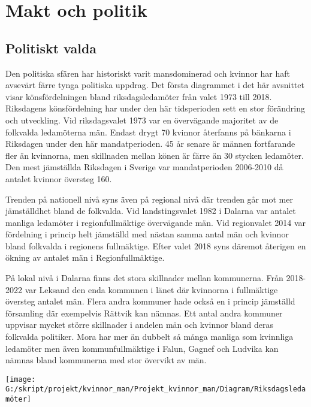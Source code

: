 \documentclass[
]{article}
\begin{document}
\hypertarget{makt-och-politik}{%
\section{Makt och politik}\label{makt-och-politik}}

\hypertarget{politiskt-valda}{%
\subsection{Politiskt valda}\label{politiskt-valda}}

Den politiska sfären har historiskt varit mansdominerad och kvinnor har
haft avsevärt färre tynga politiska uppdrag. Det första diagrammet i det
här avsnittet visar könsfördelningen bland riksdagsledamöter från valet
1973 till 2018. Riksdagens könsfördelning har under den här tidsperioden
sett en stor förändring och utveckling. Vid riksdagsvalet 1973 var en
övervägande majoritet av de folkvalda ledamöterna män. Endast drygt 70
kvinnor återfanns på bänkarna i Riksdagen under den här mandatperioden.
45 år senare är männen fortfarande fler än kvinnorna, men skillnaden
mellan könen är färre än 30 stycken ledamöter. Den mest jämställda
Riksdagen i Sverige var mandatperioden 2006-2010 då antalet kvinnor
översteg 160.

Trenden på nationell nivå syns även på regional nivå där trenden går mot
mer jämställdhet bland de folkvalda. Vid landstingsvalet 1982 i Dalarna
var antalet manliga ledamöter i regionfullmäktige övervägande män. Vid
regionvalet 2014 var fördelning i princip helt jämställd med nästan
samma antal män och kvinnor bland folkvalda i regionens fullmäktige.
Efter valet 2018 syns däremot återigen en ökning av antalet män i
Regionfullmäktige.

På lokal nivå i Dalarna finns det stora skillnader mellan kommunerna.
Från 2018-2022 var Leksand den enda kommunen i länet där kvinnorna i
fullmäktige översteg antalet män. Flera andra kommuner hade också en i
princip jämställd församling där exempelvis Rättvik kan nämnas. Ett
antal andra kommuner uppvisar mycket större skillnader i andelen män och
kvinnor bland deras folkvalda politiker. Mora har mer än dubbelt så
många manliga som kvinnliga ledamöter men även kommunfullmäktige i
Falun, Gagnef och Ludvika kan nämnas bland kommunerna med stor övervikt
av män.

\begin{center}\texttt{[image: G:/skript/projekt/kvinnor\_man/Projekt\_kvinnor\_man/Diagram/Riksdagsledamöter]} \end{center}
\end{document}
